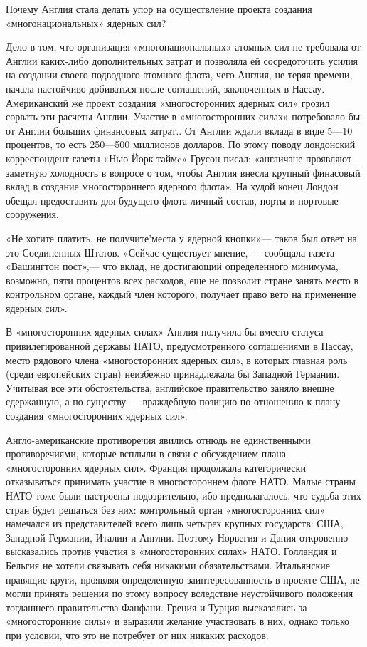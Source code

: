 \documentclass[12pt, a4paper, openany]{book}
\begin{document}
Почему Англия стала делать упор на осуществление проекта создания «многонациональных» ядерных сил?

Дело в том, что организация «многонациональных» атомных сил не требовала от Англии каких-либо дополнительных затрат и позволяла ей сосредоточить усилия на создании своего подводного атомного флота, чего Англия, не теряя времени, начала настойчиво добиваться после соглашений, заключенных в Нассау. Американский же проект создания «многосторонних ядерных сил» грозил сорвать эти расчеты Англии. Участие в «многосторонних силах» потребовало бы от Англии больших финансовых затрат.. От Англии ждали вклада в виде 5—10 процентов, то есть 250—500 миллионов долларов. По этому поводу лондонский корреспондент газеты «Нью-Йорк таймc» Грусон писал: «англичане проявляют заметную холодность в вопросе о том, чтобы Англия внесла крупный финасовый вклад в создание многостороннего ядерного флота». На худой конец Лондон обещал предоставить для будущего флота личный состав, порты и портовые сооружения.

«Не хотите платить, не получите'места у ядерной кнопки»— таков был ответ на это Соединенных Штатов. «Сейчас существует мнение, — сообщала газета «Вашингтон пост»,— что вклад, не достигающий определенного минимума, возможно, пяти процентов всех расходов, еще не позволит стране занять место в контрольном органе, каждый член которого, получает право вето на применение ядерных сил».

В «многосторонних ядерных силах» Англия получила бы вместо статуса привилегированной державы НАТО, предусмотренного соглашениями в Нассау, место рядового члена «многосторонних ядерных сил», в которых главная роль (среди европейских стран) неизбежно принадлежала бы Западной Германии. Учитывая все эти обстоятельства, английское правительство заняло внешне сдержанную, а по существу — враждебную позицию по отношению к плану создания «многосторонних ядерных сил».

Англо-американские противоречия явились отнюдь не единственными противоречиями, которые всплыли в связи с обсуждением плана «многосторонних ядерных сил». Франция продолжала категорически отказываться принимать участие в многостороннем флоте НАТО. Малые страны НАТО тоже были настроены подозрительно, ибо предполагалось, что судьба этих стран будет решаться без них: контрольный орган «многосторонних сил» намечался из представителей всего лишь четырех крупных государств: США, Западной Германии, Италии и Англии. Поэтому Норвегия и Дания откровенно высказались против участия в «многосторонних силах» НАТО. Голландия и Бельгия не хотели связывать себя никакими обязательствами. Итальянские правящие круги, проявляя определенную заинтересованность в проекте США, не могли принять решения по этому вопросу вследствие неустойчивого положения тогдашнего правительства Фанфани. Греция и Турция высказались за «многосторонние силы» и выразили желание участвовать в них, однако только при условии, что это не потребует от них никаких расходов.
\end{document}
